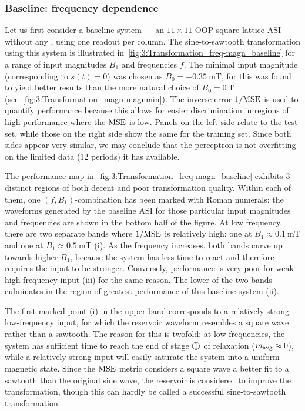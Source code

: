 \subsubsection{Baseline: frequency dependence}
Let us first consider a baseline system --- an $11 \times 11$ OOP square-lattice ASI without any , using one readout per column.
The sine-to-sawtooth transformation using this system is illustrated in~\cref{fig:3:Transformation_freq-magn_baseline} for a range of input magnitudes $B_1$ and frequencies $f$.
The minimal input magnitude (corresponding to $s(t) = 0$) was chosen as $B_0 = \SI{-0.35}{\milli\tesla}$, for this was found to yield better results than the more natural choice of $B_0 = \SI{0}{\tesla}$ (see~\cref{fig:3:Transformation_magn-magnmin}).
The inverse error $1/\mathrm{MSE}$ is used to quantify performance because this allows for easier discrimination in regions of high performance where the $\mathrm{MSE}$ is low.
Panels on the left side relate to the test set, while those on the right side show the same for the training set.
Since both sides appear very similar, we may conclude that the perceptron is not overfitting on the limited data (12 periods) it has available. \par
The performance map in~\cref{fig:3:Transformation_freq-magn_baseline} exhibits 3 distinct regions of both decent and poor transformation quality.
Within each of them, one $(f, B_1)$-combination has been marked with Roman numerals: the waveforms generated by the baseline ASI for those particular input magnitudes and frequencies are shown in the bottom half of the figure.
At low frequency, there are two separate bands where $1/\mathrm{MSE}$ is relatively high: one at $B_1 \approx \SI{0.1}{\milli\tesla}$  and one at $B_1 \approx \SI{0.5}{\milli\tesla}$ \textsf{(i)}.
As the frequency increases, both bands curve up towards higher $B_1$, because the system has less time to react and therefore requires the input to be stronger.
Conversely, performance is very poor for weak high-frequency input \textsf{(iii)} for the same reason.
The lower of the two bands culminates in the region of greatest performance of this baseline system \textsf{(ii)}. \par %
The first marked point \textsf{(i)} in the upper band corresponds to a relatively strong low-frequency input, for which the reservoir waveform resembles a square wave rather than a sawtooth.
The reason for this is twofold: at low frequencies, the system has sufficient time to reach the end of stage $\circled{1}$ of relaxation ($m_\mathrm{avg} \approx 0$), while a relatively strong input will easily saturate the system into a uniform magnetic state. %
Since the $\mathrm{MSE}$ metric considers a square wave a better fit to a sawtooth than the original sine wave, the reservoir is considered to improve the transformation, though this can hardly be called a successful sine-to-sawtooth transformation.

